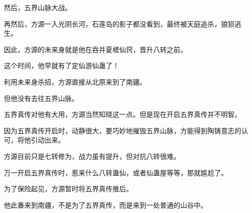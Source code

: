 \begin{this_body}
然后，五界山脉大战。

再然后，方源一入光阴长河，石莲岛的影子都没看到，最终被天庭追杀，狼狈逃生。

因此，方源的未来身就是他在吞并夏槎仙窍，晋升八转之前。

这个时间，他早就有了定仙游仙蛊了！

利用未来身杀招，方源直接从北原来到了南疆。

但他没有去往五界山脉。

五界真传对他有大用，方源当然知晓这一点。但是现在开启五界真传并不明智。

因为五界真传开启时，动静很大，要巧妙地摧毁五界山脉，方能得到陶铸意志的认可，将他引动出来。

方源目前只是七转修为，战力虽有提升，但对抗八转很难。

万一开启五界真传时，惹来什么八转蛊仙，或者仙蛊屋等等，那就尴尬了。

为了保险起见，方源暂时将五界真传推后。

他此番来到南疆，不是为了五界真传，而是来到一处普通的山谷中。

\end{this_body}


